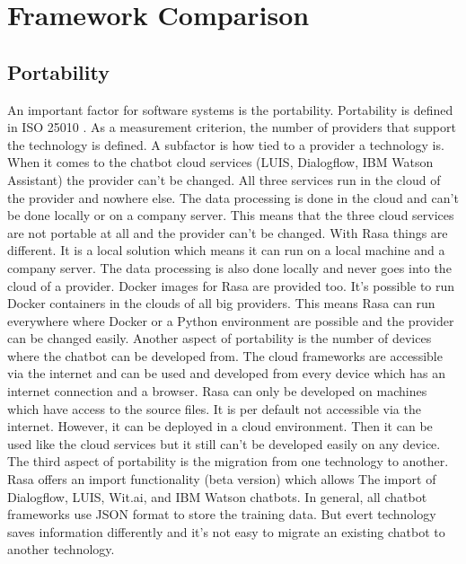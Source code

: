 
\section{Framework Comparison}

\subsection*{Portability}
An important factor for software systems is the portability.
Portability is defined in ISO 25010 \cite{iso25010}.
As a measurement criterion, the number of providers that support the technology is defined.
A subfactor is how tied to a provider a technology is.
When it comes to the chatbot cloud services (LUIS, Dialogflow, IBM Watson Assistant)
the provider can't be changed.
All three services run in the cloud of the provider and nowhere else.
The data processing is done in the cloud and can't be done locally or on a company server.
This means that the three cloud services are not portable at all and 
the provider can't be changed.
With Rasa things are different.
It is a local solution which means it can run on a local machine and a company server.
The data processing is also done locally and never goes into the cloud of a provider.
Docker images for Rasa are provided too.
It's possible to run Docker containers in the clouds of all big providers.
This means Rasa can run everywhere where Docker or a Python environment are possible 
and the provider can be changed easily.
Another aspect of portability is the number of devices where the chatbot can be developed
from.
The cloud frameworks are accessible via the internet and can be used 
and developed from every device which has an internet connection and a
browser.
Rasa can only be developed on machines which have access to the 
source files.
It is per default not accessible via the internet.
However, it can be deployed in a cloud environment.
Then it can be used like the cloud services but it 
still can't be developed easily on any device.
The third aspect of portability is the migration from one technology to another.
Rasa offers an import functionality (beta version) which allows The
import of Dialogflow, LUIS, Wit.ai, and IBM Watson chatbots.
In general, all chatbot frameworks use JSON format to store
the training data.
But evert technology saves information differently and it's not 
easy to migrate an existing chatbot to another technology.

